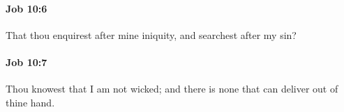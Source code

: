 		\paragraph{Job 10:6} %
			\label{JOB-10-6}

			That thou enquirest after mine iniquity, and searchest after my sin?


		\paragraph{Job 10:7} %
			\label{JOB-10-7}

			Thou knowest that I am not wicked; and there is none that can deliver out of thine hand.



